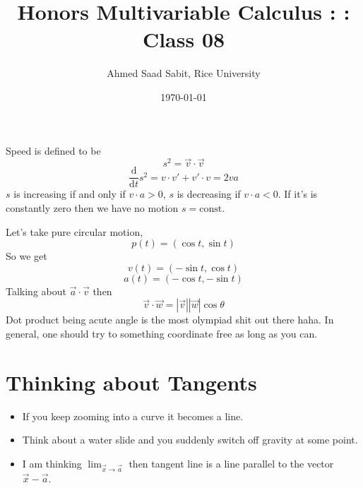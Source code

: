 \documentclass[letter]{article}
\title{Honors Multivariable Calculus : : Class 08}
\author{Ahmed Saad Sabit, Rice University}
\date{\today}
\begin{document}
\maketitle 
Speed is defined to be \[
s ^2 = \vec{v} \cdot \vec{v}
\] 
\[
\frac{\mathrm{d} }{\mathrm{d} t} s^2 = v \cdot v' + v' \cdot  v = 2va
\] 
$s$ is increasing if and only if $v\cdot a > 0$, $s$ is decreasing if $v\cdot a< 0$. If it's is constantly zero then we have no motion $s = \text{const}$. 

Let's take pure circular motion,
\[
p(t) = (\cos t, \sin t)
\] So we get \[
v(t) = (-\sin t, \cos t)
\] 
\[
a(t) = (- \cos t, -\sin t)
\] 
Talking about $\vec{a}\cdot \vec{v}$ then 
\[
\vec{v} \cdot \vec{w} = |\vec{v}| |\vec{w}| \cos \theta
\] 
Dot product being acute angle is the most olympiad shit out there haha. In general, one should try to something coordinate free as long as you can.

\section{Thinking about Tangents} 
\begin{itemize}
	\item If you keep zooming into a curve it becomes a line. 
	\item Think about a water slide and you suddenly switch off gravity at some point. 
	\item I am thinking $\lim_{\vec{x} \to \vec{a}} $ then tangent line is a line parallel to the vector $\vec{x}-\vec{a}$. 
\end{itemize}
\end{document}
